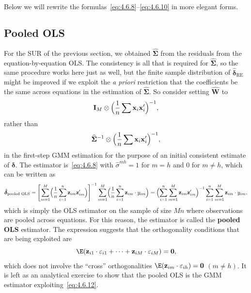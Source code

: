 Below we will rewrite the formulas~\eqref{eq:4.6.8}--\eqref{eq:4.6.10} in more
elegant forms.

\subsection*{Pooled OLS}

For the SUR of the previous section, we obtained $\widehat{\boldsymbol{\Sigma}}$
from the residuals from the equation-by-equation OLS. The consistency is all that
is required for $\widehat{\boldsymbol{\Sigma}}$, so the same procedure works here
just as well, but the finite sample distribution of
$\hat{\boldsymbol{\delta}}_{\mathrm{RE}}$ might be improved if we exploit the
\textit{a priori} restriction that the coefficients be the same across equations
in the estimation of $\widehat{\boldsymbol{\Sigma}}$.
So consider setting $\hat{\mathbf{W}}$ to
\[
\mathbf{I}_M \otimes \Bigl(\frac{1}{n} \sum \mathbf{x}_i \mathbf{x}_i'\Bigr)^{-1},
\]
rather than
\[
\widehat{\boldsymbol{\Sigma}}^{-1} \otimes
\Bigl(\frac{1}{n} \sum \mathbf{x}_i \mathbf{x}_i'\Bigr)^{-1},
\]
in the first-step GMM estimation for the purpose of an initial consistent
estimate of $\boldsymbol{\delta}$. The estimator is~\eqref{eq:4.6.8} with
$\hat{\sigma}^{mh} = 1$ for $m = h$ and $0$ for $m \neq h$,
which can be written as
\begin{equation}
\hat{\boldsymbol{\delta}}_{\text{pooled OLS}}
= \left[\sum_{m=1}^{M} \Bigl(\frac{1}{n} \sum_{i=1}^{n}
\mathbf{z}_{im} \mathbf{z}_{im}'\Bigr)\right]^{-1}
\sum_{m=1}^{M} \Bigl(\frac{1}{n} \sum_{i=1}^{n}
\mathbf{z}_{im} \cdot y_{im}\Bigr)
= \Bigl(\sum_{i=1}^{n} \sum_{m=1}^{M}
\mathbf{z}_{im} \mathbf{z}_{im}'\Bigr)^{-1}
\sum_{i=1}^{n} \sum_{m=1}^{M} \mathbf{z}_{im} \cdot y_{im},
\label{eq:4.6.11}
\end{equation}
which is simply the OLS estimator on the sample of size $Mn$ where observations
are pooled across equations. For this reason, the estimator is called the
\textbf{pooled OLS} estimator. The expression suggests that the orthogonality conditions
that are being exploited are
\begin{equation}
\E(\mathbf{z}_{i1} \cdot \varepsilon_{i1} + \cdots
+ \mathbf{z}_{iM} \cdot \varepsilon_{iM}) = \mathbf{0},
\label{eq:4.6.12}
\end{equation}
which does not involve the ``cross'' orthogonalities
$\E(\mathbf{z}_{im} \cdot \varepsilon_{ih}) = \mathbf{0}$ $(m \neq h)$.
It is left as an analytical exercise to show that the pooled OLS is the GMM estimator
exploiting~\eqref{eq:4.6.12}.

